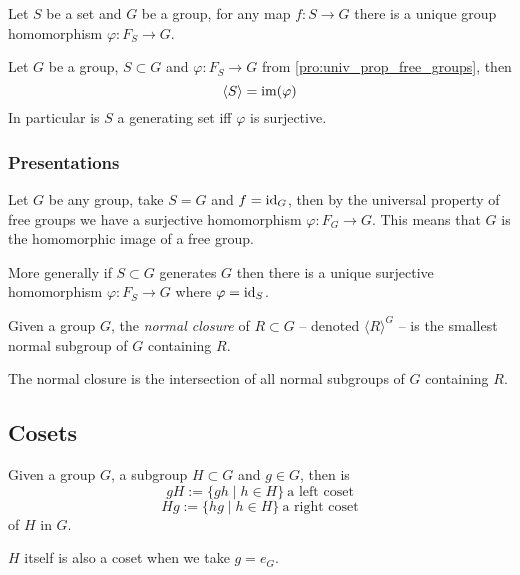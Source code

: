 \begin{proposition}\label{pro:univ_prop_free_groups}
   Let \(S\) be a set and \(G\) be a group, for any map \(f: S \to G\) there is a unique group homomorphism \(\varphi: F_S \to G\).
   \begin{center}
   \end{center}
\end{proposition}

\begin{proposition}
   Let \(G\) be a group, \(S \subset G\) and \(\varphi: F_S \to G\) from \ref{pro:univ_prop_free_groups}, then
   \[\langle S \rangle = \operatorname{im}(\varphi)\]
   In particular is \(S\) a generating set iff \(\varphi\) is surjective.
\end{proposition}

\subsubsection{Presentations}
Let \(G\) be any group, take \(S = G\) and \(f = \operatorname{id}_G\), then by the universal property of free groups we have a surjective homomorphism \(\varphi: F_G \to G\).
This means that \(G\) is the homomorphic image of a free group.

More generally if \(S \subset G\) generates \(G\) then there is a unique surjective homomorphism \(\varphi: F_S \to G\) where \(\varphi = \operatorname{id}_S\).

\begin{definition}
   Given a group \(G\), the \emph{normal closure} of \(R \subset G\) -- denoted \(\langle R \rangle^G\) -- is the smallest normal subgroup of \(G\) containing \(R\).
\end{definition}
\begin{remark}
   The normal closure is the intersection of all normal subgroups of \(G\) containing \(R\).
\end{remark}

\subsection{Cosets}
\begin{definition}
   Given a group \(G\), a subgroup \(H \subset G\) and \(g \in G\), then is
   \[gH := \{gh \mid h \in H\}~\text{a left coset}\]
   \[Hg := \{hg \mid h \in H\}~\text{a right coset}\]
   of \(H\) in \(G\).
\end{definition}
\begin{remark}
   \(H\) itself is also a coset when we take \(g = e_G\).
\end{remark}

